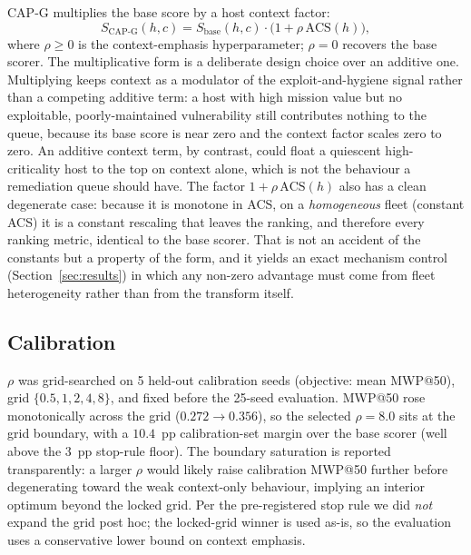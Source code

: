 CAP-G multiplies the base score by a host context factor:
%
\begin{equation}
S_{\mathrm{CAP\text{-}G}}(h,c) = S_{\mathrm{base}}(h,c)\cdot\bigl(1+\rho\,\mathrm{ACS}(h)\bigr),
\label{eq:capg}
\end{equation}
%
where $\rho\geq 0$ is the context-emphasis hyperparameter; $\rho{=}0$ recovers the base
scorer. The multiplicative form is a deliberate design choice over an additive one. Multiplying
keeps context as a modulator of the exploit-and-hygiene signal rather than a competing additive
term: a host with high mission value but no exploitable, poorly-maintained vulnerability still
contributes nothing to the queue, because its base score is near zero and the context factor
scales zero to zero. An additive context term, by contrast, could float a quiescent
high-criticality host to the top on context alone, which is not the behaviour a remediation queue
should have. The factor $1+\rho\,\mathrm{ACS}(h)$ also has a clean degenerate case: because it is
monotone in ACS, on a \emph{homogeneous} fleet (constant ACS) it is a constant rescaling that
leaves the ranking, and therefore every ranking metric, identical to the base scorer. That is not
an accident of the constants but a property of the form, and it yields an exact mechanism control
(Section~\ref{sec:results}) in which any non-zero advantage must come from fleet heterogeneity
rather than from the transform itself.

\subsection{Calibration}

$\rho$ was grid-searched on 5 held-out calibration seeds (objective: mean MWP@50), grid
$\{0.5,1,2,4,8\}$, and fixed before the 25-seed evaluation. MWP@50 rose monotonically
across the grid ($0.272\!\rightarrow\!0.356$), so the selected $\rho{=}8.0$ sits at the
grid boundary, with a $10.4$~pp calibration-set margin over the base scorer (well above the
$3$~pp stop-rule floor). The boundary saturation is reported transparently: a larger
$\rho$ would likely raise calibration MWP@50 further before degenerating toward the weak
context-only behaviour, implying an interior optimum beyond the locked grid. Per the
pre-registered stop rule we did \emph{not} expand the grid post hoc; the locked-grid
winner is used as-is, so the evaluation uses a conservative lower bound on context
emphasis.
